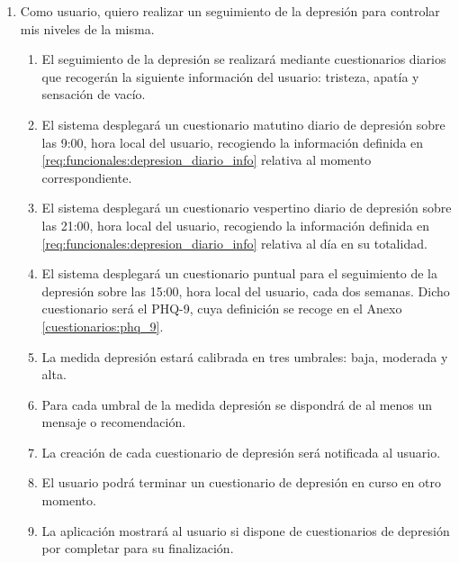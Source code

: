         \begin{enumerate}[resume=req-usuario,label=\textbf{\texttt{RU-\arabic*}}]
            \item \label{req:usuario:seguimiento_depresion} Como usuario, quiero realizar un seguimiento de la depresión para controlar mis niveles de la misma.
            \begin{enumerate}[resume=req-funcionales,label=\textbf{\texttt{RF-\arabic*}}]
                \item \label{req:funcionales:depresion_diario_info} El seguimiento de la depresión se realizará mediante cuestionarios diarios que recogerán la siguiente información del usuario: tristeza, apatía y sensación de vacío.
                \item \label{req:funcionales:depresion_diario_manana} El sistema desplegará un cuestionario matutino diario de depresión sobre las 9:00, hora local del usuario, recogiendo la información definida en \ref{req:funcionales:depresion_diario_info} relativa al momento correspondiente.
                \item \label{req:funcionales:depresion_diario_noche}  El sistema desplegará un cuestionario vespertino diario de depresión sobre las 21:00, hora local del usuario, recogiendo la información definida en \ref{req:funcionales:depresion_diario_info} relativa al día en su totalidad.
                \item \label{req:funcionales:depresion_puntual} El sistema desplegará un cuestionario puntual para el seguimiento de la depresión sobre las 15:00, hora local del usuario, cada dos semanas. Dicho cuestionario será el PHQ-9, cuya definición se recoge en el Anexo \ref{cuestionarios:phq_9}.
                \item \label{req:funcionales:depresion_umbrales} La medida depresión estará calibrada en tres umbrales: baja, moderada y alta.
                \item \label{req:funcionales:depresion_umbrales_consejo} Para cada umbral de la medida depresión se dispondrá de al menos un mensaje o recomendación.
                \item \label{req:funcionales:depresion_notificacion} La creación de cada cuestionario de depresión será notificada al usuario.
                \item \label{req:funcionales:depresion_cuestionario_aplazar} El usuario podrá terminar un cuestionario de depresión en curso en otro momento.
                \item \label{req:funcionales:depresion_cuestionario_pendientes} La aplicación mostrará al usuario si dispone de cuestionarios de depresión por completar para su finalización.

\end{enumerate}
\end{enumerate}
